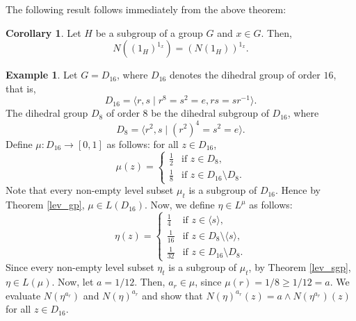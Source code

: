 \documentclass[10pt]{article}
\theoremstyle{plain}
\theoremstyle{definition}
\newtheorem{corollary}[theorem]{Corollary}
\newtheorem{example}{\sc Example}
\theoremstyle{remark}
\theoremstyle{case}
\begin{document}
\noindent The following result follows immediately from the above theorem:

\begin{corollary}
	Let $H$ be a subgroup of a group $G$ and $x \in G$. Then,
	\[ N({(1_H)}^{1_x}) = (N(1_H))^{1_x}. \]
\end{corollary}

\begin{example} \label{ex_conjnorm}
	Let $G = D_{16}$, where $D_{16}$ denotes the dihedral group of order $16$, that is,
	\[ D_{16} = \langle r,s \mid r^8 = s^2 = e, rs = sr^{-1} \rangle. \]
	The dihedral group $D_8$ of order $8$ be the dihedral subgroup of $D_{16}$,  where
	\[ D_8 = \langle r^2, s \mid (r^2)^4 = s^2 = e \rangle. \]
	Define $\mu : D_{16} \rightarrow [0,1]$ as follows: for all $z \in D_{16}$,
	\[ \mu(z) = \begin{cases}
		\frac{1}{2}	&\text{if } z \in D_8,\\
		\frac{1}{8} &\text{if } z \in D_{16} \setminus D_8.
	\end{cases} \]
	Note that every non-empty level subset $\mu_t$ is a subgroup of $D_{16}$. Hence by Theorem \ref{lev_gp}, $\mu \in L(D_{16})$. Now, we define $\eta \in L^{\mu}$ as follows:
	\[ \eta(z) = \begin{cases}
		\frac{1}{4} &\text{if } z \in \langle s \rangle, \\
		\frac{1}{16} &\text{if } z \in D_8 \setminus \langle s \rangle, \\
		\frac{1}{32} &\text{if } z \in D_{16} \setminus D_8.
	\end{cases} \]
	Since every non-empty level subset $\eta_t$ is a subgroup of $\mu_t$, by Theorem \ref{lev_sgp}, $\eta \in L(\mu)$. Now, let $a = 1/12$. Then, $a_r \in \mu$, since $\mu(r) = 1/8 \geq 1/12 = a$. We evaluate $N(\eta^{a_r})$ and $N(\eta)^{a_r}$ and show that $N(\eta)^{a_r}(z) = a \wedge N(\eta^{a_r})(z)$ for all $z \in D_{16}$. 
	

\end{example}
\end{document}
